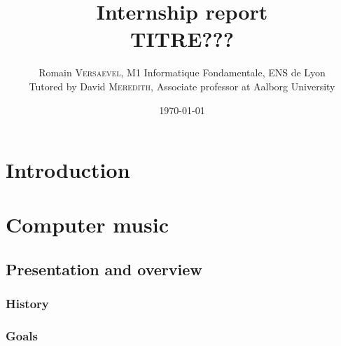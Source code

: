 \documentclass[a4paper,10pt]{article}
\title{ \Large Internship report \\ \LARGE TITRE???}
\author{\normalsize Romain \textsc{Versaevel}, M1 Informatique Fondamentale, ENS de Lyon \\ \normalsize Tutored by David \textsc{Meredith}, Associate professor at Aalborg University\\}
\date{\today}
\newcommand{\anym}{anym???}
\newcommand{\guill}[1]{«~#1~»}
\begin{document}
\maketitle

\begin{abstract}
\end{abstract}

\newpage
\tableofcontents
\newpage


\section{Introduction}




\section{Computer music}

\subsection{Presentation and overview}
\subsubsection{History}
\subsubsection{Goals} %
\end{document}
